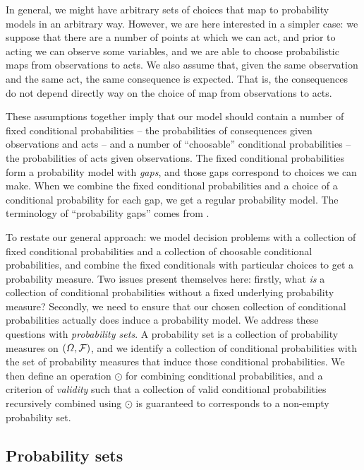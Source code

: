 In general, we might have arbitrary sets of choices that map to probability models in an arbitrary way. However, we are here interested in a simpler case: we suppose that there are a number of points at which we can act, and prior to acting we can observe some variables, and we are able to choose probabilistic maps from observations to acts. We also assume that, given the same observation and the same act, the same consequence is expected. That is, the consequences do not depend directly way on the choice of map from observations to acts.

These assumptions together imply that our model should contain a number of fixed conditional probabilities -- the probabilities of consequences given observations and acts -- and a number of ``choosable'' conditional probabilities -- the probabilities of acts given observations. The fixed conditional probabilities form a probability model with \emph{gaps}, and those gaps correspond to choices we can make. When we combine the fixed conditional probabilities and a choice of a conditional probability for each gap, we get a regular probability model. The terminology of ``probability gaps'' comes from \citet{hajek_what_2003}. 

To restate our general approach: we model decision problems with a collection of fixed conditional probabilities and a collection of choosable conditional probabilities, and combine the fixed conditionals with particular choices to get a probability measure. Two issues present themselves here: firstly, what \emph{is} a collection of conditional probabilities without a fixed underlying probability measure? Secondly, we need to ensure that our chosen collection of conditional probabilities actually does induce a probability model. We address these questions with \emph{probability sets}. A probability set is a collection of probability measures on $(\Omega,\mathcal{F})$, and we identify a collection of conditional probabilities with the set of probability measures that induce those conditional probabilities. We then define an operation $\odot$ for combining conditional probabilities, and a criterion of \emph{validity} such that a collection of valid conditional probabilities recursively combined using $\odot$ is guaranteed to corresponds to a non-empty probability set.

\subsection{Probability sets}

